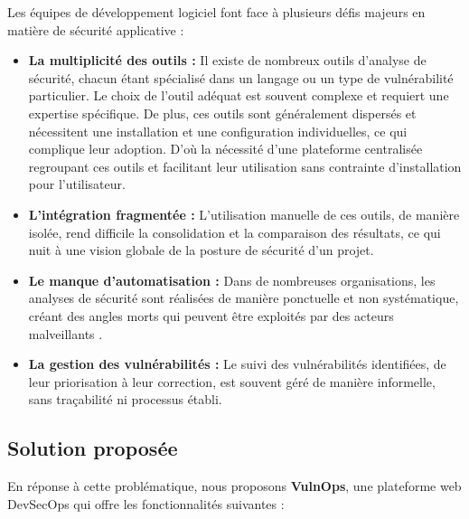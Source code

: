 \documentclass[12pt, a4paper, oneside]{report}
\begin{document}
Les équipes de développement logiciel font face à plusieurs défis majeurs en
matière de sécurité applicative :

\begin{itemize}
    \item \textbf{La multiplicité des outils :} Il existe de nombreux outils d’analyse de sécurité, chacun étant spécialisé dans un langage ou un type de vulnérabilité particulier. Le choix de l’outil adéquat est souvent complexe et requiert une expertise spécifique. De plus, ces outils sont généralement dispersés et nécessitent une installation et une configuration individuelles, ce qui complique leur adoption. D’où la nécessité d’une plateforme centralisée regroupant ces outils et facilitant leur utilisation sans contrainte d’installation pour l’utilisateur.
    
    \item \textbf{L'intégration fragmentée :} L'utilisation manuelle de ces outils,
    de manière isolée, rend difficile la consolidation et la comparaison des
    résultats, ce qui nuit à une vision globale de la posture de sécurité d'un
    projet.
    
    \item \textbf{Le manque d'automatisation :} Dans de nombreuses organisations,
    les analyses de sécurité sont réalisées de manière ponctuelle et non systématique,
    créant des angles morts qui peuvent être exploités par des acteurs malveillants
    \cite{owasptop10}.
    
    \item \textbf{La gestion des vulnérabilités :} Le suivi des vulnérabilités
    identifiées, de leur priorisation à leur correction, est souvent géré de
    manière informelle, sans traçabilité ni processus établi.
\end{itemize}

\subsection{Solution proposée}
\label{subsec:solution}

En réponse à cette problématique, nous proposons \textbf{VulnOps}, une plateforme
web DevSecOps qui offre les fonctionnalités suivantes :
\end{document}
